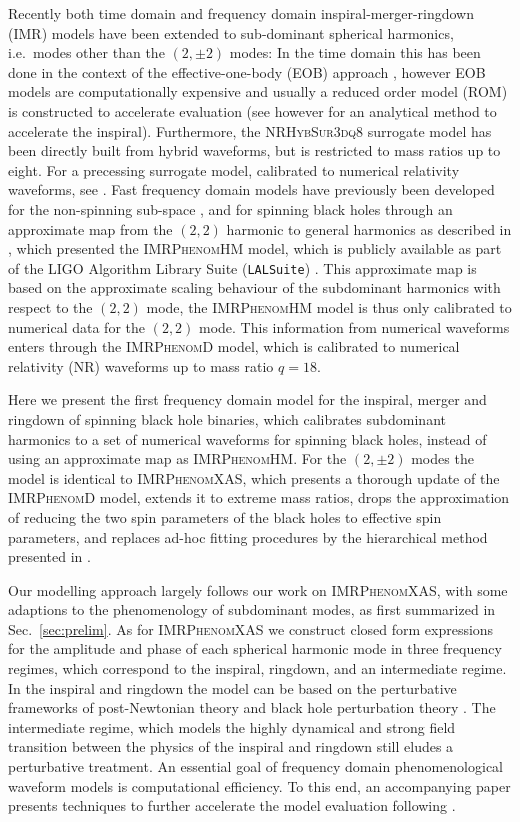 \documentclass[twocolumn,prd,aps,superscriptaddress,preprintnumbers,tightenlines,showpacs,nofootinbib,eqsecnum,amsfonts,amsmath]{revtex4}
\newcommand{\phD}{\textsc{IMRPhenomD}\xspace}
\newcommand{\phX}{\textsc{IMRPhenomXAS}\xspace}
\newcommand{\phHM}{\textsc{IMRPhenomHM}\xspace}
\newcommand{\surro}{\textsc{NRHybSur3dq8}\xspace}
\begin{document}
Recently both time domain and frequency domain inspiral-merger-ringdown (IMR) models have been extended to sub-dominant spherical harmonics, i.e.~modes other than the $(2,\pm2)$ modes: In the time domain this has been done in the context of the effective-one-body (EOB) approach \cite{Cotesta:2018fcv}, however EOB models are computationally expensive and usually a reduced order model (ROM) is constructed to accelerate evaluation \cite{Puerrer2014,Purrer:2015tud} (see however \cite{Nagar:2018gnk} for an analytical method to accelerate the inspiral). 
Furthermore, the \surro surrogate model \cite{Varma:2018mmi} has been directly built from hybrid waveforms, but is restricted to mass ratios up to eight.
For a precessing surrogate model, calibrated to numerical relativity waveforms, see \cite{Varma:2019csw}.
%
Fast frequency domain models have previously been developed for the non-spinning sub-space \cite{Mehta:2017jpq,Mehta:2019wxm}, and for spinning black holes through an approximate map from the $(2,2)$ harmonic to general harmonics as described in \cite{London:2017bcn}, which presented the \phHM model, which is  publicly available as part of the LIGO Algorithm Library Suite (\texttt{LALSuite}) \cite{lalsuite}.
%
This approximate map is based on the approximate scaling behaviour of the subdominant harmonics with respect to the $(2,2)$ mode, the \phHM model is thus only calibrated to numerical data for the $(2,2)$ mode. This information from numerical waveforms enters through the \phD model, which is calibrated to numerical relativity (NR) waveforms up to mass ratio $q=18$. 

Here we present the first frequency domain model for the inspiral, merger and ringdown of spinning black hole binaries, which calibrates subdominant harmonics to a set of numerical waveforms for spinning black holes, instead of using an approximate map as \phHM.
For the $(2,\pm2)$ modes the model is identical to \phX \cite{phenX}, which presents a thorough update of the \phD model, extends it to extreme mass ratios, drops the approximation of reducing the two spin parameters of the black holes to effective spin parameters, and replaces ad-hoc fitting procedures by the hierarchical method presented in \cite{Jimenez-Forteza:2016oae}.

Our modelling approach largely follows our work on  \phX, with some adaptions to the phenomenology of subdominant modes, as first summarized in Sec.~\ref{sec:prelim}. As for \phX we construct closed form expressions for the amplitude and phase of each spherical harmonic mode in three frequency regimes, which correspond to the inspiral, ringdown, and an intermediate regime.
In the inspiral and ringdown the model can be based on the perturbative frameworks of post-Newtonian theory \cite{Blanchet2014}
and black hole perturbation theory \cite{Kokkotas1999}. The intermediate regime, which models the highly dynamical and strong field transition between the physics of the inspiral and ringdown still eludes a perturbative treatment.
An essential goal of frequency domain phenomenological waveform models is computational efficiency. To this end, an accompanying paper \cite{our_mb} presents techniques to further accelerate the model evaluation following \cite{Vinciguerra:2017ngf}.
\end{document}
